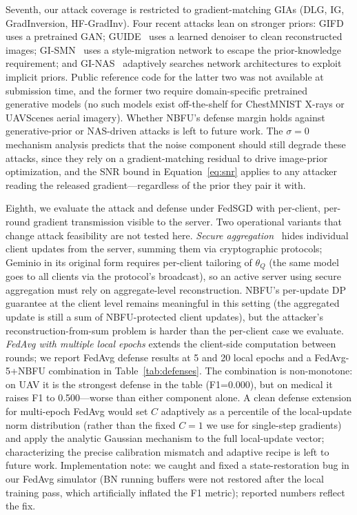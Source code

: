 \documentclass[11pt]{article}
\begin{document}
Seventh, our attack coverage is restricted to gradient-matching GIAs (DLG, IG, GradInversion, HF-GradInv). Four recent attacks lean on stronger priors: GIFD~\citep{fang2023gifd} uses a pretrained GAN; GUIDE~\citep{guide2025} uses a learned denoiser to clean reconstructed images; \mbox{GI-SMN}~\citep{gismn2024} uses a style-migration network to escape the prior-knowledge requirement; and GI-NAS~\citep{ginas2025} adaptively searches network architectures to exploit implicit priors. Public reference code for the latter two was not available at submission time, and the former two require domain-specific pretrained generative models (no such models exist off-the-shelf for ChestMNIST X-rays or UAVScenes aerial imagery). Whether NBFU's defense margin holds against generative-prior or NAS-driven attacks is left to future work. The $\sigma{=}0$ mechanism analysis predicts that the noise component should still degrade these attacks, since they rely on a gradient-matching residual to drive image-prior optimization, and the SNR bound in Equation~\ref{eq:snr} applies to any attacker reading the released gradient---regardless of the prior they pair it with.

Eighth, we evaluate the attack and defense under FedSGD with per-client, per-round gradient transmission visible to the server. Two operational variants that change attack feasibility are not tested here. \emph{Secure aggregation}~\citep{bonawitz2017} hides individual client updates from the server, summing them via cryptographic protocols; Geminio in its original form requires per-client tailoring of $\theta_Q$ (the same model goes to all clients via the protocol's broadcast), so an active server using secure aggregation must rely on aggregate-level reconstruction. NBFU's per-update DP guarantee at the client level remains meaningful in this setting (the aggregated update is still a sum of NBFU-protected client updates), but the attacker's reconstruction-from-sum problem is harder than the per-client case we evaluate. \emph{FedAvg with multiple local epochs} extends the client-side computation between rounds; we report FedAvg defense results at 5 and 20 local epochs and a FedAvg-5+NBFU combination in Table~\ref{tab:defenses}. The combination is non-monotone: on UAV it is the strongest defense in the table (F1=0.000), but on medical it raises F1 to 0.500---worse than either component alone. A clean defense extension for multi-epoch FedAvg would set $C$ adaptively as a percentile of the local-update norm distribution (rather than the fixed $C{=}1$ we use for single-step gradients) and apply the analytic Gaussian mechanism to the full local-update vector; characterizing the precise calibration mismatch and adaptive recipe is left to future work. Implementation note: we caught and fixed a state-restoration bug in our FedAvg simulator (BN running buffers were not restored after the local training pass, which artificially inflated the F1 metric); reported numbers reflect the fix.
\end{document}
